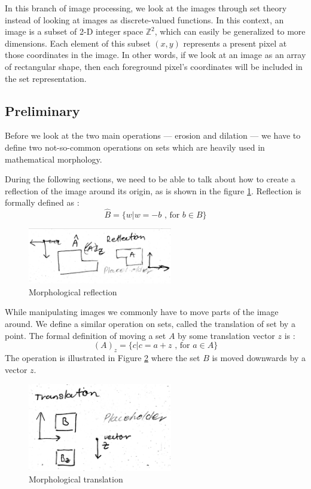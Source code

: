 \documentclass[
  digital,     %
  oneside,     %
  nosansbold,  %
  nocolorbold, %
  lof,         %
  lot,         %
]{fithesis4}
\newcommand*{\Z}{\ensuremath{\mathbb{Z}}}
\begin{document}
In this branch of image processing, we look at the images through set theory
instead of looking at images as discrete-valued functions. In this context, an
image is a subset of 2-D integer space $\Z^2$, which can easily be generalized
to more dimensions. Each element of this subset $(x, y)$ represents a present
pixel at those coordinates in the image. In other words, if we look at an image
as an array of rectangular shape, then each foreground pixel's coordinates will
be included in the set representation.

\subsection{Preliminary}
Before we look at the two main operations --- erosion and dilation --- we have to
define two not-so-common operations on sets which are heavily used in
mathematical morphology.

During the following sections, we need to be able to talk about how to create a
reflection of the image around its origin, as is shown in the figure
\ref{fig:morp_refl}. Reflection is formally defined as \parencite{gonzalez2002}: 
$$\hat{B} = \{w | w=-b \text{ , for } b \in B\}$$
\begin{figure}
    \begin{center}
        \includegraphics[width=6.3cm]{resources/morph_reflection.jpg}
    \end{center}
    \caption{Morphological reflection} %
    \label{fig:morp_refl}
\end{figure}

While manipulating images we commonly have to move parts of the image around. We
define a similar operation on sets, called the translation of set by a point. The formal definition of
moving a set $A$ by some translation vector $z$ is \parencite{gonzalez2002}:
$$(A)_z = \{c | c = a + z\text{ , for } a \in A\}$$
The operation is illustrated in Figure \ref{fig:morph_translation} where the set
$B$ is moved downwards by a vector $z$.
\begin{figure}
    \begin{center}
        \includegraphics[width=6.3cm]{resources/morph_translation.jpg}
    \end{center}
    \caption{Morphological translation} %
    \label{fig:morph_translation}
\end{figure}
\end{document}
